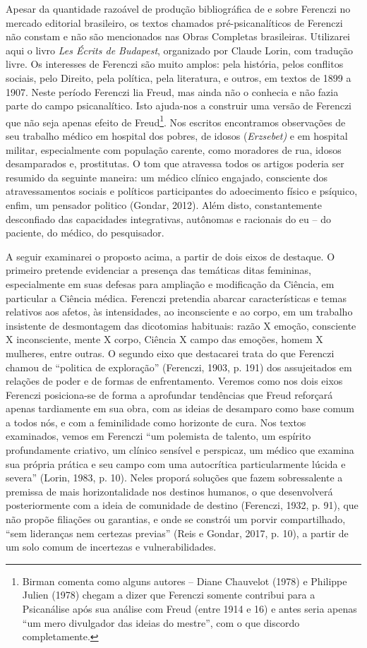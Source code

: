 Apesar da quantidade razoável de produção bibliográfica de e sobre
Ferenczi no mercado editorial brasileiro, os textos chamados
pré-psicanalíticos de Ferenczi não constam e não são mencionados nas
Obras Completas brasileiras. Utilizarei aqui o livro \emph{Les Écrits de
Budapest}, organizado por Claude Lorin, com tradução livre. Os
interesses de Ferenczi são muito amplos: pela história, pelos conflitos
sociais, pelo Direito, pela política, pela literatura, e outros, em
textos de 1899 a 1907. Neste período Ferenczi lia Freud, mas ainda não o
conhecia e não fazia parte do campo psicanalítico. Isto ajuda-nos a
construir uma versão de Ferenczi que não seja apenas efeito de
Freud\footnote{Birman comenta como alguns autores -- Diane Chauvelot
  (1978) e Philippe Julien (1978) chegam a dizer que Ferenczi somente
  contribui para a Psicanálise após sua análise com Freud (entre 1914 e
  16) e antes seria apenas ``um mero divulgador das ideias do mestre'',
  com o que discordo completamente.}. Nos escritos encontramos
observações de seu trabalho médico em hospital dos pobres, de idosos
(\emph{Erzsebet)} e em hospital militar, especialmente com população
carente, como moradores de rua, idosos desamparados e, prostitutas. O
tom que atravessa todos os artigos poderia ser resumido da seguinte
maneira: um médico clínico engajado, consciente dos atravessamentos
sociais e políticos participantes do adoecimento físico e psíquico,
enfim, um pensador politico (Gondar, 2012). Além disto, constantemente
desconfiado das capacidades integrativas, autônomas e racionais do eu --
do paciente, do médico, do pesquisador.

A seguir examinarei o proposto acima, a partir de dois eixos de
destaque. O primeiro pretende evidenciar a presença das temáticas ditas
femininas, especialmente em suas defesas para ampliação e modificação da
Ciência, em particular a Ciência médica. Ferenczi pretendia abarcar
características e temas relativos aos afetos, às intensidades, ao
inconsciente e ao corpo, em um trabalho insistente de desmontagem das
dicotomias habituais: razão X emoção, consciente X inconsciente, mente X
corpo, Ciência X campo das emoções, homem X mulheres, entre outras. O
segundo eixo que destacarei trata do que Ferenczi chamou de ``politica
de exploração'' (Ferenczi, 1903, p. 191) dos assujeitados em relações de
poder e de formas de enfrentamento. Veremos como nos dois eixos Ferenczi
posiciona-se de forma a aprofundar tendências que Freud reforçará apenas
tardiamente em sua obra, com as ideias de desamparo como base comum a
todos nós, e com a feminilidade como horizonte de cura. Nos textos
examinados, vemos em Ferenczi ``um polemista de talento, um espírito
profundamente criativo, um clínico sensível e perspicaz, um médico que
examina sua própria prática e seu campo com uma autocrítica
particularmente lúcida e severa'' (Lorin, 1983, p. 10). Neles proporá
soluções que fazem sobressalente a premissa de mais horizontalidade nos
destinos humanos, o que desenvolverá posteriormente com a ideia de
comunidade de destino (Ferenczi, 1932, p. 91), que não propõe filiações
ou garantias, e onde se constrói um porvir compartilhado, ``sem
lideranças nem certezas previas'' (Reis e Gondar, 2017, p. 10), a partir
de um solo comum de incertezas e vulnerabilidades.

